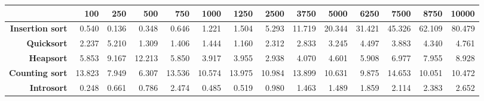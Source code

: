 \begin{tabular}{rrrrrrrrrrrrrr}
\hline
                         &   \textbf{100} &   \textbf{250} &   \textbf{500} &   \textbf{750} &   \textbf{1000} &   \textbf{1250} &   \textbf{2500} &   \textbf{3750} &   \textbf{5000} &   \textbf{6250} &   \textbf{7500} &   \textbf{8750} &   \textbf{10000} \\
\hline
 \textbf{Insertion sort} &          0.540 &          0.136 &          0.348 &          0.646 &           1.221 &           1.504 &           5.293 &          11.719 &          20.344 &          31.421 &          45.326 &          62.109 &           80.479 \\
      \textbf{Quicksort} &          2.237 &          5.210 &          1.309 &          1.406 &           1.444 &           1.160 &           2.312 &           2.833 &           3.245 &           4.497 &           3.883 &           4.340 &            4.761 \\
       \textbf{Heapsort} &          5.853 &          9.167 &         12.213 &          5.850 &           3.917 &           3.955 &           2.938 &           4.070 &           4.601 &           5.908 &           6.977 &           7.955 &            8.928 \\
  \textbf{Counting sort} &         13.823 &          7.949 &          6.307 &         13.536 &          10.574 &          13.975 &          10.984 &          13.899 &          10.631 &           9.875 &          14.653 &          10.051 &           10.472 \\
      \textbf{Introsort} &          0.248 &          0.661 &          0.786 &          2.474 &           0.485 &           0.519 &           0.980 &           1.463 &           1.489 &           1.859 &           2.114 &           2.383 &            2.652 \\
\hline
\end{tabular}